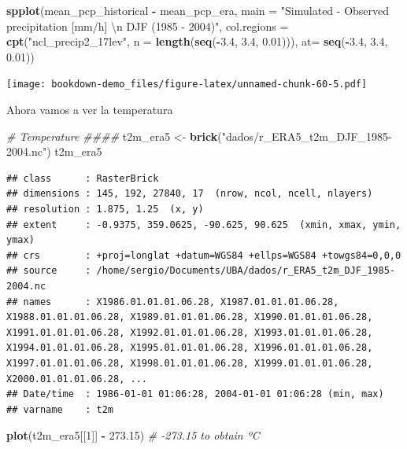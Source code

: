 \documentclass[]{book}
\newenvironment{Shaded}{\begin{snugshade}}{\end{snugshade}}
\newcommand{\CharTok}[1]{\textcolor[rgb]{0.31,0.60,0.02}{#1}}
\newcommand{\CommentTok}[1]{\textcolor[rgb]{0.56,0.35,0.01}{\textit{#1}}}
\newcommand{\DataTypeTok}[1]{\textcolor[rgb]{0.13,0.29,0.53}{#1}}
\newcommand{\DecValTok}[1]{\textcolor[rgb]{0.00,0.00,0.81}{#1}}
\newcommand{\FloatTok}[1]{\textcolor[rgb]{0.00,0.00,0.81}{#1}}
\newcommand{\KeywordTok}[1]{\textcolor[rgb]{0.13,0.29,0.53}{\textbf{#1}}}
\newcommand{\NormalTok}[1]{#1}
\newcommand{\OperatorTok}[1]{\textcolor[rgb]{0.81,0.36,0.00}{\textbf{#1}}}
\newcommand{\StringTok}[1]{\textcolor[rgb]{0.31,0.60,0.02}{#1}}
\begin{document}
\begin{Shaded}
\begin{Highlighting}[]
\KeywordTok{spplot}\NormalTok{(mean_pcp_historical }\OperatorTok{-}\StringTok{ }\NormalTok{mean_pcp_era,}
            \DataTypeTok{main =} \StringTok{"Simulated - Observed precipitation [mm/h] }\CharTok{\textbackslash{}n}\StringTok{ DJF (1985 - 2004)"}\NormalTok{,}
            \DataTypeTok{col.regions =} \KeywordTok{cpt}\NormalTok{(}\StringTok{"ncl_precip2_17lev"}\NormalTok{, }\DataTypeTok{n =} \KeywordTok{length}\NormalTok{(}\KeywordTok{seq}\NormalTok{(}\OperatorTok{-}\FloatTok{3.4}\NormalTok{, }\FloatTok{3.4}\NormalTok{, }\FloatTok{0.01}\NormalTok{))),}
       \DataTypeTok{at=} \KeywordTok{seq}\NormalTok{(}\OperatorTok{-}\FloatTok{3.4}\NormalTok{, }\FloatTok{3.4}\NormalTok{, }\FloatTok{0.01}\NormalTok{))}
\end{Highlighting}
\end{Shaded}

\texttt{[image: bookdown-demo\_files/figure-latex/unnamed-chunk-60-5.pdf]}

Ahora vamos a ver la temperatura

\begin{Shaded}
\begin{Highlighting}[]
\CommentTok{# Temperature ####}
\NormalTok{t2m_era5 <-}\StringTok{ }\KeywordTok{brick}\NormalTok{(}\StringTok{"dados/r_ERA5_t2m_DJF_1985-2004.nc"}\NormalTok{)}
\NormalTok{t2m_era5}
\end{Highlighting}
\end{Shaded}

\begin{verbatim}
## class      : RasterBrick 
## dimensions : 145, 192, 27840, 17  (nrow, ncol, ncell, nlayers)
## resolution : 1.875, 1.25  (x, y)
## extent     : -0.9375, 359.0625, -90.625, 90.625  (xmin, xmax, ymin, ymax)
## crs        : +proj=longlat +datum=WGS84 +ellps=WGS84 +towgs84=0,0,0 
## source     : /home/sergio/Documents/UBA/dados/r_ERA5_t2m_DJF_1985-2004.nc 
## names      : X1986.01.01.01.06.28, X1987.01.01.01.06.28, X1988.01.01.01.06.28, X1989.01.01.01.06.28, X1990.01.01.01.06.28, X1991.01.01.01.06.28, X1992.01.01.01.06.28, X1993.01.01.01.06.28, X1994.01.01.01.06.28, X1995.01.01.01.06.28, X1996.01.01.01.06.28, X1997.01.01.01.06.28, X1998.01.01.01.06.28, X1999.01.01.01.06.28, X2000.01.01.01.06.28, ... 
## Date/time  : 1986-01-01 01:06:28, 2004-01-01 01:06:28 (min, max)
## varname    : t2m
\end{verbatim}

\begin{Shaded}
\begin{Highlighting}[]
\KeywordTok{plot}\NormalTok{(t2m_era5[[}\DecValTok{1}\NormalTok{]] }\OperatorTok{-}\StringTok{ }\FloatTok{273.15}\NormalTok{)      }\CommentTok{# -273.15 to obtain ºC}
\end{Highlighting}
\end{Shaded}
\end{document}
